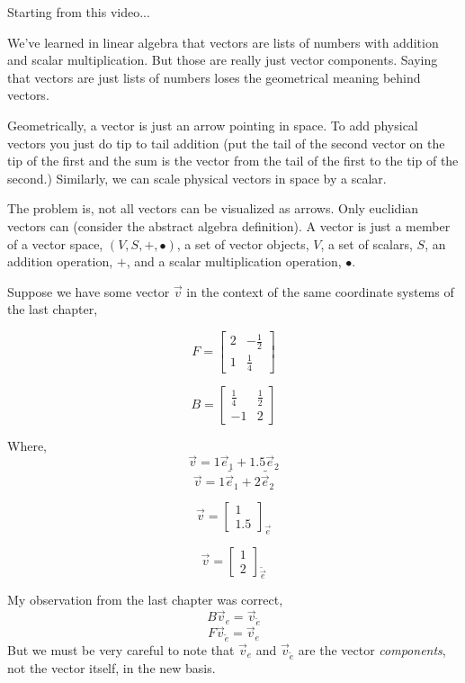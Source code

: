 \documentclass[12pt]{book}
\theoremstyle{plain}
\theoremstyle{definition}
\theoremstyle{ppart}
\theoremstyle{case}
\theoremstyle{solution}
\begin{document}
Starting from this \cite{youtube:tensor2} video...

We've learned in linear algebra that vectors are lists of numbers with addition and scalar multiplication.
But those are really just vector components.
Saying that vectors are just lists of numbers loses the geometrical meaning behind vectors.

Geometrically, a vector is just an arrow pointing in space. 
To add physical vectors you just do tip to tail addition (put the tail of the second vector on the tip of the first and
the sum is the vector from the tail of the first to the tip of the second.)
Similarly, we can scale physical vectors in space by a scalar. 

The problem is, not all vectors can be visualized as arrows. Only euclidian vectors can (consider the abstract
algebra definition). A vector is just a member of a vector space, $(V,S,+,\bullet)$, a set of vector objects, $V$,
a set of scalars, $S$, an addition operation, $+$, and a scalar multiplication operation, $\bullet$.

Suppose we have some vector $\vec{v}$ in the context of the same coordinate systems of the last chapter,

\[
  F =
  \begin{bmatrix}
  2 & -\frac{1}{2} \\
  1 & \frac{1}{4}
  \end{bmatrix}
\]

\[
  B =
  \begin{bmatrix}
  \frac{1}{4} & \frac{1}{2} \\
  -1 & 2 
  \end{bmatrix}
\]

Where,
\[ \vec{v} = 1 \vec{e}_1 + 1.5 \vec{e}_2 \]
\[ \vec{v} = 1 \widetilde{\vec{e}_1} + 2 \widetilde{\vec{e}_2} \]

\[ \vec{v} = 
  \begin{bmatrix}
  1 \\
  1.5
  \end{bmatrix}_{\vec{e}}
\]

\[ \vec{v} = 
  \begin{bmatrix}
  1 \\
  2 
  \end{bmatrix}_{\widetilde{\vec{e}}}
\]

My observation from the last chapter was correct,
\[ B \vec{v}_{e} = \vec{v}_{\widetilde{e}} \]
\[ F \vec{v}_{\widetilde{e}} = \vec{v}_{e} \]
But we must be very careful to note that $\vec{v}_{e}$ and $\vec{v}_{\widetilde{e}}$ are the vector {\em{components}}, not the vector itself, in the new basis.
\end{document}
